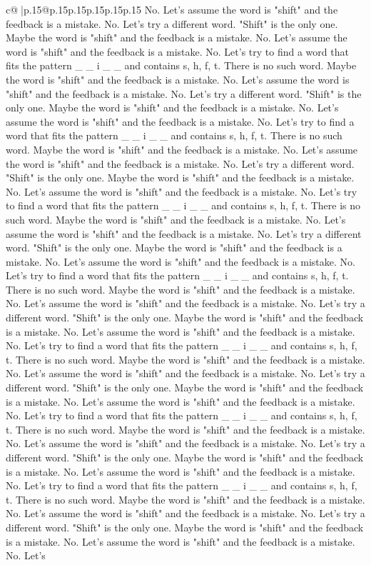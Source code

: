 \documentclass{article}
\begin{document}
{\begin{supertabular}{c@{$\;$}|p{.15\linewidth}@{}p{.15\linewidth}p{.15\linewidth}p{.15\linewidth}p{.15\linewidth}p{.15\linewidth}}
{{{No. Let's assume the word is "shift" and the feedback is a mistake. No. Let's try a different word. "Shift" is the only one. Maybe the word is "shift" and the feedback is a mistake. No. Let's assume the word is "shift" and the feedback is a mistake. No. Let's try to find a word that fits the pattern \_ \_ i \_ \_ and contains s, h, f, t. There is no such word. Maybe the word is "shift" and the feedback is a mistake. No. Let's assume the word is "shift" and the feedback is a mistake. No. Let's try a different word. "Shift" is the only one. Maybe the word is "shift" and the feedback is a mistake. No. Let's assume the word is "shift" and the feedback is a mistake. No. Let's try to find a word that fits the pattern \_ \_ i \_ \_ and contains s, h, f, t. There is no such word. Maybe the word is "shift" and the feedback is a mistake. No. Let's assume the word is "shift" and the feedback is a mistake. No. Let's try a different word. "Shift" is the only one. Maybe the word is "shift" and the feedback is a mistake. No. Let's assume the word is "shift" and the feedback is a mistake. No. Let's try to find a word that fits the pattern \_ \_ i \_ \_ and contains s, h, f, t. There is no such word. Maybe the word is "shift" and the feedback is a mistake. No. Let's assume the word is "shift" and the feedback is a mistake. No. Let's try a different word. "Shift" is the only one. Maybe the word is "shift" and the feedback is a mistake. No. Let's assume the word is "shift" and the feedback is a mistake. No. Let's try to find a word that fits the pattern \_ \_ i \_ \_ and contains s, h, f, t. There is no such word. Maybe the word is "shift" and the feedback is a mistake. No. Let's assume the word is "shift" and the feedback is a mistake. No. Let's try a different word. "Shift" is the only one. Maybe the word is "shift" and the feedback is a mistake. No. Let's assume the word is "shift" and the feedback is a mistake. No. Let's try to find a word that fits the pattern \_ \_ i \_ \_ and contains s, h, f, t. There is no such word. Maybe the word is "shift" and the feedback is a mistake. No. Let's assume the word is "shift" and the feedback is a mistake. No. Let's try a different word. "Shift" is the only one. Maybe the word is "shift" and the feedback is a mistake. No. Let's assume the word is "shift" and the feedback is a mistake. No. Let's try to find a word that fits the pattern \_ \_ i \_ \_ and contains s, h, f, t. There is no such word. Maybe the word is "shift" and the feedback is a mistake. No. Let's assume the word is "shift" and the feedback is a mistake. No. Let's try a different word. "Shift" is the only one. Maybe the word is "shift" and the feedback is a mistake. No. Let's assume the word is "shift" and the feedback is a mistake. No. Let's try to find a word that fits the pattern \_ \_ i \_ \_ and contains s, h, f, t. There is no such word. Maybe the word is "shift" and the feedback is a mistake. No. Let's assume the word is "shift" and the feedback is a mistake. No. Let's try a different word. "Shift" is the only one. Maybe the word is "shift" and the feedback is a mistake. No. Let's assume the word is "shift" and the feedback is a mistake. No. Let's }}}
\end{supertabular}}
\end{document}
